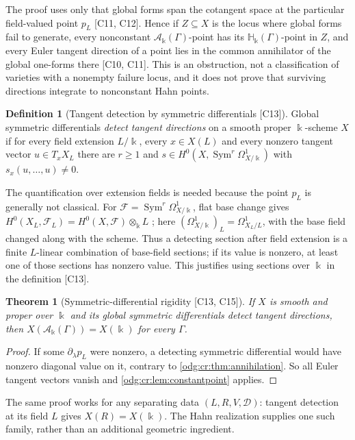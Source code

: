 \documentclass[11pt,oneside]{article}
\numberwithin{equation}{section}
\newtheorem{theorem}{Theorem}[section]
\theoremstyle{definition}
\newtheorem{definition}[definition]{Definition}
\theoremstyle{remark}
\newcommand{\src}[1]{\textup{\textsf{\small[#1]}}}
\newcommand{\crH}{\mathbb H_\Bbbk(\Gamma)}
\newcommand{\crA}{\mathcal A_\Bbbk(\Gamma)}
\newcommand{\Sym}{\operatorname{Sym}}
\begin{document}
The proof uses only that global forms span the cotangent space at the particular
field-valued point $p_L$ \src{C11, C12}. Hence if $Z\subseteq X$ is the locus where
global forms fail to generate, every nonconstant $\crA$-point has its $\crH$-point
in $Z$, and every Euler tangent direction of a point lies in the common
annihilator of the global one-forms there \src{C10, C11}. This is an obstruction,
not a classification of varieties with a nonempty failure locus, and it does not
prove that surviving directions integrate to nonconstant Hahn points.

\begin{definition}[Tangent detection by symmetric differentials \src{C13}]\label{odg:cr:def:detect}
Global symmetric differentials \emph{detect tangent directions} on a smooth proper
$\Bbbk$-scheme $X$ if for every field extension $L/\Bbbk$, every $x\in X(L)$ and
every nonzero tangent vector $u\in T_xX_L$ there are $r\ge1$ and
$s\in H^0(X,\Sym^r\Omega^1_{X/\Bbbk})$ with $s_x(u,\ldots,u)\ne0$.
\end{definition}

The quantification over extension fields is needed because the point $p_L$ is
generally not classical. For $\mathcal F=\Sym^r\Omega^1_{X/\Bbbk}$, flat base
change gives
$H^0(X_L,\mathcal F_L)=H^0(X,\mathcal F)\otimes_\Bbbk L$
\cite[Tag 02KH]{StacksBaseChange}; here
$(\Omega^1_{X/\Bbbk})_L=\Omega^1_{X_L/L}$, with the base field changed
along with the scheme. Thus a detecting section after field
extension is a finite $L$-linear combination of base-field sections; if
its value is nonzero, at least one of those sections has nonzero value.
This justifies using sections over $\Bbbk$ in the definition \src{C13}.

\begin{theorem}[Symmetric-differential rigidity \src{C13, C15}]\label{odg:cr:thm:symmetric}
If $X$ is smooth and proper over $\Bbbk$ and its global symmetric differentials
detect tangent directions, then $X(\crA)=X(\Bbbk)$ for every $\Gamma$.
\end{theorem}
\begin{proof}
If some $\partial_\lambda p_L$ were nonzero, a detecting symmetric differential
would have nonzero diagonal value on it, contrary to
\cref{odg:cr:thm:annihilation}. So all Euler tangent vectors vanish and
\cref{odg:cr:lem:constantpoint} applies.
\end{proof}

The same proof works for any separating data $(L,R,V,\mathcal D)$:
tangent detection at its field $L$ gives $X(R)=X(\Bbbk)$. The Hahn
realization supplies one such family, rather than an additional
geometric ingredient.
\end{document}
